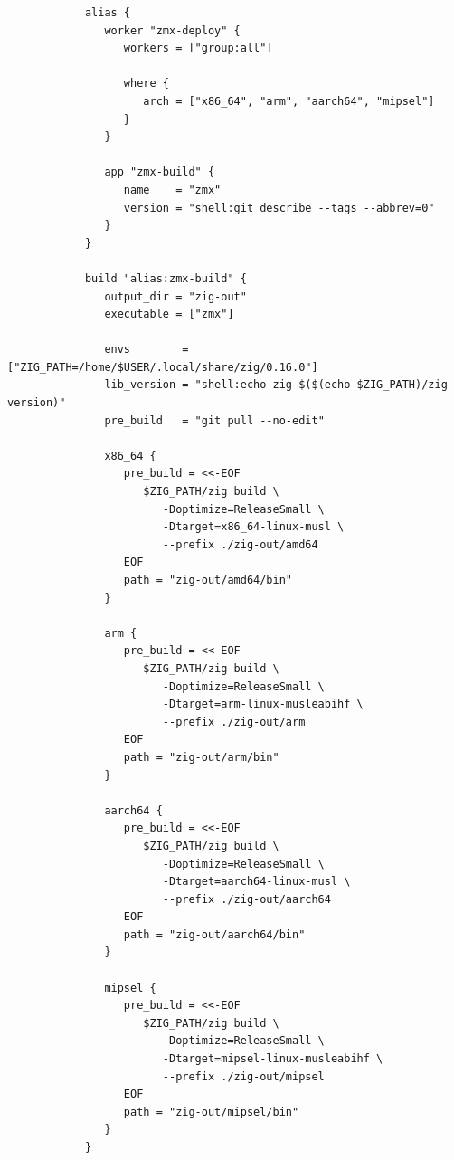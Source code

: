 \documentclass[11pt,a4paper]{article}
\begin{document}
    \begin{center}
        \scriptsize
        \begin{verbatim}
            alias {
               worker "zmx-deploy" {
                  workers = ["group:all"]

                  where {
                     arch = ["x86_64", "arm", "aarch64", "mipsel"]
                  }
               }

               app "zmx-build" {
                  name    = "zmx"
                  version = "shell:git describe --tags --abbrev=0"
               }
            }

            build "alias:zmx-build" {
               output_dir = "zig-out"
               executable = ["zmx"]

               envs        = ["ZIG_PATH=/home/$USER/.local/share/zig/0.16.0"]
               lib_version = "shell:echo zig $($(echo $ZIG_PATH)/zig version)"
               pre_build   = "git pull --no-edit"

               x86_64 {
                  pre_build = <<-EOF
                     $ZIG_PATH/zig build \
                        -Doptimize=ReleaseSmall \
                        -Dtarget=x86_64-linux-musl \
                        --prefix ./zig-out/amd64
                  EOF
                  path = "zig-out/amd64/bin"
               }

               arm {
                  pre_build = <<-EOF
                     $ZIG_PATH/zig build \
                        -Doptimize=ReleaseSmall \
                        -Dtarget=arm-linux-musleabihf \
                        --prefix ./zig-out/arm
                  EOF
                  path = "zig-out/arm/bin"
               }

               aarch64 {
                  pre_build = <<-EOF
                     $ZIG_PATH/zig build \
                        -Doptimize=ReleaseSmall \
                        -Dtarget=aarch64-linux-musl \
                        --prefix ./zig-out/aarch64
                  EOF
                  path = "zig-out/aarch64/bin"
               }

               mipsel {
                  pre_build = <<-EOF
                     $ZIG_PATH/zig build \
                        -Doptimize=ReleaseSmall \
                        -Dtarget=mipsel-linux-musleabihf \
                        --prefix ./zig-out/mipsel
                  EOF
                  path = "zig-out/mipsel/bin"
               }
            }


\end{verbatim}
\end{center}
\end{document}
